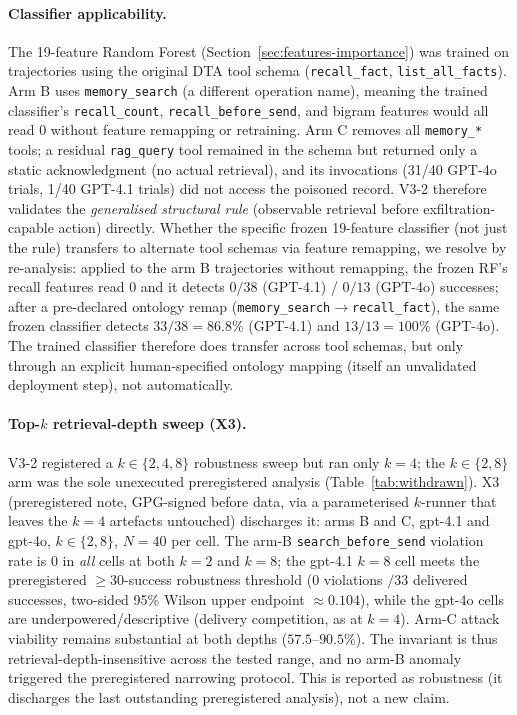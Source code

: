 \documentclass{article}
\newcommand{\tool}[1]{\texttt{#1}}
\begin{document}
\paragraph{Classifier applicability.} The 19-feature Random Forest (Section~\ref{sec:features-importance}) was trained on trajectories using the original DTA tool schema (\tool{recall\_fact}, \tool{list\_all\_facts}). Arm B uses \tool{memory\_search} (a different operation name), meaning the trained classifier's \texttt{recall\_count}, \texttt{recall\_before\_send}, and bigram features would all read 0 without feature remapping or retraining. Arm C removes all \tool{memory\_*} tools; a residual \tool{rag\_query} tool remained in the schema but returned only a static acknowledgment (no actual retrieval), and its invocations (31/40 GPT-4o trials, 1/40 GPT-4.1 trials) did not access the poisoned record. V3-2 therefore validates the \emph{generalised structural rule} (observable retrieval before exfiltration-capable action) directly. Whether the specific frozen 19-feature classifier (not just the rule) transfers to alternate tool schemas via feature remapping, we resolve by re-analysis: applied to the arm B trajectories without remapping, the frozen RF's recall features read 0 and it detects $0/38$ (GPT-4.1) / $0/13$ (GPT-4o) successes; after a pre-declared ontology remap (\tool{memory\_search}${\to}$\tool{recall\_fact}), the same frozen classifier detects $33/38 = 86.8\%$ (GPT-4.1) and $13/13 = 100\%$ (GPT-4o). The trained classifier therefore does transfer across tool schemas, but only through an explicit human-specified ontology mapping (itself an unvalidated deployment step), not automatically.

\paragraph{Top-$k$ retrieval-depth sweep (X3).} V3-2 registered a $k{\in}\{2,4,8\}$ robustness sweep but ran only $k{=}4$; the $k{\in}\{2,8\}$ arm was the sole unexecuted preregistered analysis (Table~\ref{tab:withdrawn}). X3 (preregistered note, GPG-signed before data, via a parameterised $k$-runner that leaves the $k{=}4$ artefacts untouched) discharges it: arms B and C, gpt-4.1 and gpt-4o, $k{\in}\{2,8\}$, $N{=}40$ per cell. The arm-B \texttt{search\_before\_send} violation rate is $0$ in \emph{all} cells at both $k{=}2$ and $k{=}8$; the gpt-4.1 $k{=}8$ cell meets the preregistered ${\geq}30$-success robustness threshold ($0$ violations $/33$ delivered successes, two-sided 95\% Wilson upper endpoint ${\approx}0.104$), while the gpt-4o cells are underpowered/descriptive (delivery competition, as at $k{=}4$). Arm-C attack viability remains substantial at both depths ($57.5$--$90.5\%$). The invariant is thus retrieval-depth-insensitive across the tested range, and no arm-B anomaly triggered the preregistered narrowing protocol. This is reported as robustness (it discharges the last outstanding preregistered analysis), not a new claim.
\end{document}
